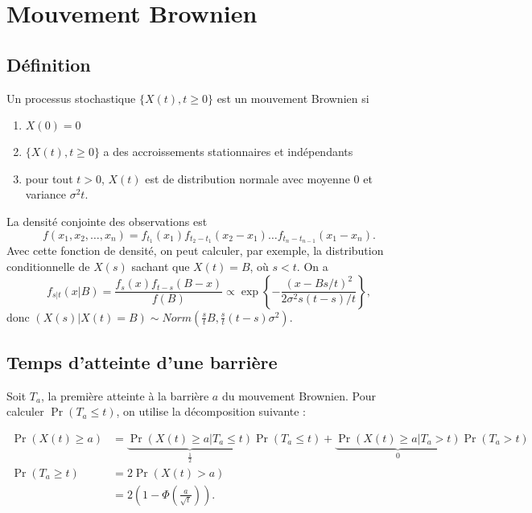 \chapter{Mouvement Brownien}\label{ch:brownien}

\section{Définition}

\begin{definition}{}{}
	Un processus stochastique $\{X(t), t\geq 0\}$ est un mouvement Brownien si 
	\begin{enumerate}
		\item $X(0) = 0$
		\item $\{X(t), t\geq 0\}$ a des accroissements stationnaires et indépendants
		\item pour tout $t>0$, $X(t)$ est de distribution normale avec moyenne 0 et variance $\sigma^2 t$.
	\end{enumerate}
\end{definition}

La densité conjointe des observations est 
$$f(x_1, x_2, \dots, x_n) = f_{t_1}(x_1)f_{t_2 - t_1}(x_2 - x_1) \dots f_{t_n - t_{n-1}}(x_1 - x_n).$$
Avec cette fonction de densité, on peut calculer, par exemple, la distribution conditionnelle de $X(s)$ sachant que $X(t) = B$, où $s<t$. On a 
$$f_{s\vert t}(x \vert B) = \frac{f_{s}(x) f_{t-s}(B - x)}{f(B)} \propto \exp\left\{-\frac{(x - Bs/t)^2}{2\sigma^2 s(t-s)/t}\right\},$$
donc $(X(s) \vert X(t) = B) \sim Norm\left(\frac{s}{t}B, \frac{s}{t}(t-s)\sigma^2\right)$. 

\section{Temps d'atteinte d'une barrière}

Soit $T_a$, la première atteinte à la barrière $a$ du mouvement Brownien. Pour calculer $\Pr(T_a \leq t)$, on utilise la décomposition suivante : 

\begin{align*}
\Pr(X(t) \geq a) &= \underbrace{\Pr(X(t) \geq a \vert T_a \leq t)}_{\frac{1}{2}} \Pr(T_a \leq t) + \underbrace{\Pr(X(t) \geq a \vert T_a > t)}_{0} \Pr(T_a > t)\\
\Pr(T_a \geq t) &= 2\Pr(X(t) > a)\\
&= 2\left(1 - \Phi \left(\frac{a}{\sqrt{t}}\right)\right).
\end{align*}

